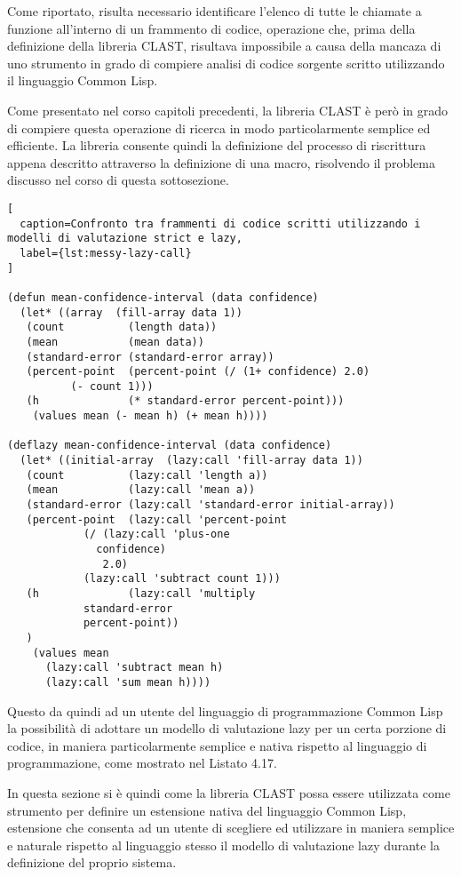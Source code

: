 Come riportato, risulta necessario identificare l'elenco di tutte le chiamate a
funzione all'interno di un frammento di codice, operazione che, prima della
definizione della libreria CLAST, risultava impossibile a causa della mancaza di
uno strumento in grado di compiere analisi di codice sorgente scritto
utilizzando il linguaggio Common Lisp.

Come presentato nel corso capitoli precedenti, la libreria CLAST è però in grado
di compiere questa operazione di ricerca in modo particolarmente semplice ed
efficiente. La libreria consente quindi la definizione del processo di
riscrittura appena descritto attraverso la definizione di una macro, risolvendo
il problema discusso nel corso di questa sottosezione.\\

\begin{lstlisting}[
  caption=Confronto tra frammenti di codice scritti utilizzando i modelli di valutazione strict e lazy,
  label={lst:messy-lazy-call}
]

(defun mean-confidence-interval (data confidence)
  (let* ((array  (fill-array data 1))
   (count          (length data))
   (mean           (mean data))
   (standard-error (standard-error array))
   (percent-point  (percent-point (/ (1+ confidence) 2.0)
          (- count 1)))
   (h              (* standard-error percent-point)))
    (values mean (- mean h) (+ mean h))))

(deflazy mean-confidence-interval (data confidence)
  (let* ((initial-array  (lazy:call 'fill-array data 1))
   (count          (lazy:call 'length a))
   (mean           (lazy:call 'mean a))
   (standard-error (lazy:call 'standard-error initial-array))
   (percent-point  (lazy:call 'percent-point
            (/ (lazy:call 'plus-one
              confidence)
               2.0)
            (lazy:call 'subtract count 1)))
   (h              (lazy:call 'multiply
            standard-error
            percent-point))
   )
    (values mean
      (lazy:call 'subtract mean h)
      (lazy:call 'sum mean h))))

\end{lstlisting}

Questo da quindi ad un utente del linguaggio di programmazione Common Lisp la
possibilità di adottare un modello di valutazione lazy per un certa porzione di
codice, in maniera particolarmente semplice e nativa rispetto al linguaggio di
programmazione, come mostrato nel Listato 4.17.

In questa sezione si è quindi come la libreria CLAST possa essere utilizzata
come strumento per definire un estensione nativa del linguaggio Common Lisp,
estensione che consenta ad un utente di scegliere ed utilizzare in maniera
semplice e naturale rispetto al linguaggio stesso il modello di valutazione lazy
durante la definizione del proprio sistema.

